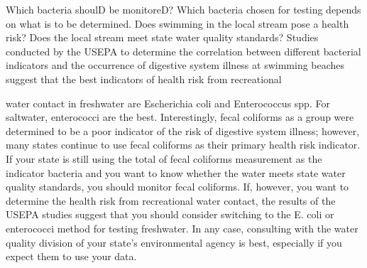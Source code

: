 \documentclass{article}
\begin{document}
Which bacteria shoulD be monitoreD? Which bacteria chosen for testing
depends on what is to be determined. Does swimming in the local stream
pose a health risk? Does the local stream meet state water quality
standards? Studies conducted by the USEPA to determine the correlation
between different bacterial indicators and the occurrence of digestive
system illness at swimming beaches suggest that the best indicators of
health risk from recreational

water contact in freshwater are Escherichia coli and Enterococcus spp.
For saltwater, enterococci are the best. Interestingly, fecal coliforms
as a group were determined to be a poor indicator of the risk of
digestive system illness; however, many states continue to use fecal
coliforms as their primary health risk indicator. If your state is still
using the total of fecal coliforms measurement as the indicator bacteria
and you want to know whether the water meets state water quality
standards, you should monitor fecal coliforms. If, however, you want to
determine the health risk from recreational water contact, the results
of the USEPA studies suggest that you should consider switching to the
E. coli or enterococci method for testing freshwater. In any case,
consulting with the water quality division of your state's environmental
agency is best, especially if you expect them to use your data.
\end{document}

